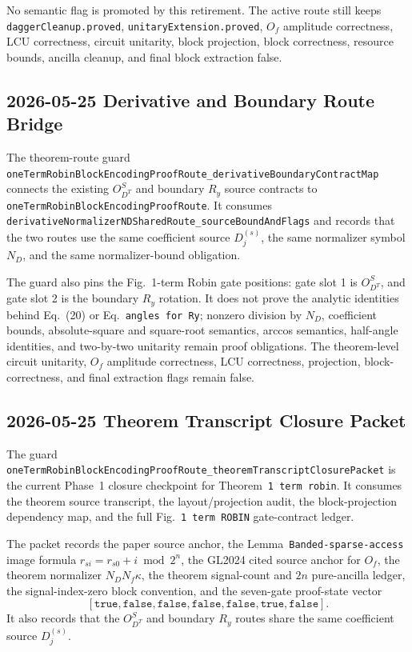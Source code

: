 No semantic flag is promoted by this retirement.  The active route still keeps
\texttt{daggerCleanup.proved}, \texttt{unitaryExtension.proved}, \(O_f\)
amplitude correctness, LCU correctness, circuit unitarity, block projection,
block correctness, resource bounds, ancilla cleanup, and final block
extraction false.

\subsection{2026-05-25 Derivative and Boundary Route Bridge}

The theorem-route guard
\texttt{oneTermRobinBlockEncodingProofRoute\_derivativeBoundaryContractMap}
connects the existing \(O_{D^T}^{S}\) and boundary \(R_y\) source contracts to
\texttt{oneTermRobinBlockEncodingProofRoute}.  It consumes
\texttt{derivativeNormalizerNDSharedRoute\_sourceBoundAndFlags} and records
that the two routes use the same coefficient source \(D_j^{(s)}\), the same
normalizer symbol \(N_D\), and the same normalizer-bound obligation.

The guard also pins the Fig.~1-term Robin gate positions: gate slot 1 is
\(O_{D^T}^{S}\), and gate slot 2 is the boundary \(R_y\) rotation.  It does
not prove the analytic identities behind Eq.~(20) or Eq.~\texttt{angles for
Ry}; nonzero division by \(N_D\), coefficient bounds, absolute-square and
square-root semantics, arccos semantics, half-angle identities, and
two-by-two unitarity remain proof obligations.  The theorem-level circuit
unitarity, \(O_f\) amplitude correctness, LCU correctness, projection,
block-correctness, and final extraction flags remain false.

\subsection{2026-05-25 Theorem Transcript Closure Packet}

The guard
\texttt{oneTermRobinBlockEncodingProofRoute\_theoremTranscriptClosurePacket}
is the current Phase~1 closure checkpoint for Theorem~\texttt{1 term robin}.
It consumes the theorem source transcript, the layout/projection audit, the
block-projection dependency map, and the full Fig.~\texttt{1 term ROBIN}
gate-contract ledger.

The packet records the paper source anchor, the Lemma~\texttt{Banded-sparse-access}
image formula \(r_{si}=r_{s0}+i \bmod 2^n\), the GL2024 cited source anchor
for \(O_f\), the theorem normalizer \(N_DN_f\kappa\), the theorem signal-count
and \(2n\) pure-ancilla ledger, the signal-index-zero block convention, and
the seven-gate proof-state vector
\[
  [\texttt{true},\texttt{false},\texttt{false},
    \texttt{false},\texttt{false},\texttt{true},\texttt{false}].
\]
It also records that the \(O_{D^T}^{S}\) and boundary \(R_y\) routes share the
same coefficient source \(D_j^{(s)}\).

